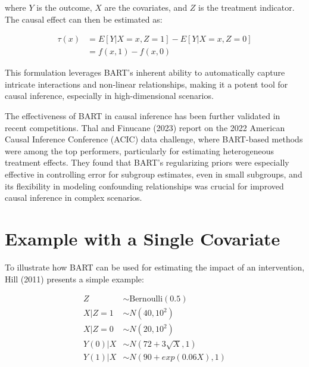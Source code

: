 \documentclass[
  letterpaper,
  DIV=11,
  numbers=noendperiod]{scrreprt}
\begin{document}
where \(Y\) is the outcome, \(X\) are the covariates, and \(Z\) is the
treatment indicator. The causal effect can then be estimated as:

\[
\begin{aligned}
\tau(x) & = E[Y | X=x, Z=1] - E[Y | X=x, Z=0] \\
 & = f(x, 1) - f(x, 0)
\end{aligned}
\]

This formulation leverages BART's inherent ability to automatically
capture intricate interactions and non-linear relationships, making it a
potent tool for causal inference, especially in high-dimensional
scenarios.

The effectiveness of BART in causal inference has been further validated
in recent competitions. Thal and Finucane (2023) report on the 2022
American Causal Inference Conference (ACIC) data challenge, where
BART-based methods were among the top performers, particularly for
estimating heterogeneous treatment effects. They found that BART's
regularizing priors were especially effective in controlling error for
subgroup estimates, even in small subgroups, and its flexibility in
modeling confounding relationships was crucial for improved causal
inference in complex scenarios.

\section{Example with a Single
Covariate}\label{example-with-a-single-covariate}

To illustrate how BART can be used for estimating the impact of an
intervention, Hill (2011) presents a simple example:

\[
\begin{aligned}
Z &\sim \mbox{Bernoulli}(0.5) \\
X | Z = 1 &\sim N(40,10^2) \\
X | Z = 0 &\sim N(20,10^2) \\
Y(0) | X &\sim N(72 + 3\sqrt{X},1) \\
Y(1) | X &\sim N(90 + exp(0.06X),1) 
\end{aligned}
\]
\end{document}
